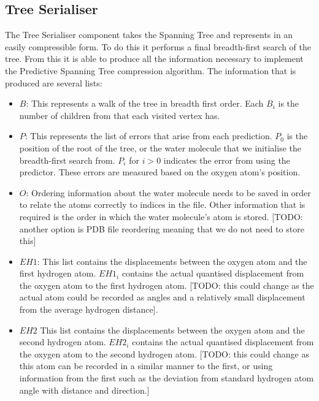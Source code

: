 \documentclass[a4paper,11pt]{report}
\begin{document}
\subsection{Tree Serialiser}

The Tree Serialiser component takes the Spanning Tree and represents in an easily compressible form. To do this it performs a final breadth-first search of the tree. From this it is able to produce all the information necessary to implement the Predictive Spanning Tree compression algorithm. The information that is produced are several lists:

\begin{itemize}
 \item $B$: This represents a walk of the tree in breadth first order. Each $B_i$ is the number of children from that each visited vertex has.

 \item $P$: This represents the list of errors that arise from each prediction. $P_0$ is the position of the root of the tree, or the water molecule that we initialise the breadth-first search from. $P_i$ for $i > 0$ indicates the error from using the predictor. These errors are measured based on the oxygen atom's position.

 \item $O$: Ordering information about the water molecule needs to be saved in order to relate the atoms correctly to indices in the file. Other information that is required is the order in which the water molecule's atom is stored. [TODO: another option is PDB file reordering meaning that we do not need to store this] 

 \item $EH1$: This list contains the displacements between the oxygen atom and the first hydrogen atom. $EH1_i$ contains the actual quantised displacement from the oxygen atom to the first hydrogen atom. [TODO: this could change as the actual atom could be recorded as angles and a relatively small displacement from the average hydrogen distance].

 \item $EH2$ This list contains the displacements between the oxygen atom and the second hydrogen atom. $EH2_i$ contains the actual quantised displacement from the oxygen atom to the second hydrogen atom. [TODO: this could change as this atom can be recorded in a similar manner to the first, or using information from the first such as the deviation from standard hydrogen atom angle with distance and direction.]
\end{itemize}
\end{document}
